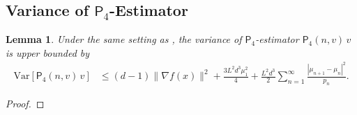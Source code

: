 \documentclass{article}
\newcommand{\Var}{\mathrm{Var}}
\theoremstyle{definition}
\theoremstyle{plain}
\newtheorem{lemma}[definition]{Lemma}
\theoremstyle{remark}
\newcommand{\sfP}{\mathsf{P}}
\begin{document}
\subsection{Variance of $\mathsf{P}_4$-Estimator}%

\begin{lemma}\label{lemma:variance-p4}
    Under the same setting as , the variance of $\sfP_4$-estimator $\mathsf P_4(n,v)\,v$ is upper bounded by
\begin{align*}
      \Var[\mathsf P_4(n,v)\,v  ] & \leq (d-1) \| \nabla f(x) \|^2 + \frac{3L^2 d^3 \mu_1^2}{4}  +  \frac{L^2 d^3}{2}\sum_{n=1}^\infty \frac{| \mu_{n+1} - \mu_{n}|^2}{p_n} .
\end{align*} 
\end{lemma}
\begin{proof}


\end{proof}
\end{document}
